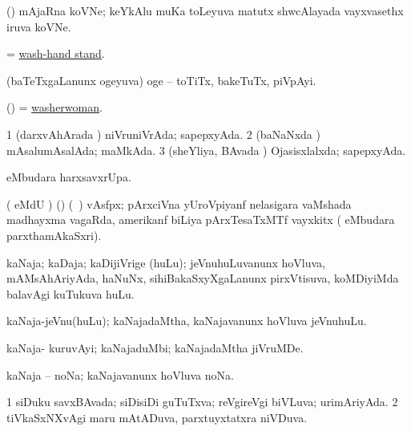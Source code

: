 \bentry
{} 
\gl{\nA}
\expl{}
\bmng
(\ame) mAjaRna koVNe; keYkAlu muKa toLeyuva matutx shwcAlayada vayxvasethx iruva koVNe. 
\emng
\eentry

\bentry
{} 
\gl{\nA}
\expl{}
\bmng
= \hyperlink{wash-hand stand}{wash-hand stand}. 
\emng
\eentry

\bentry
{} 
\gl{\nA}
\expl{}
\bmng
(baTeTxgaLanunx ogeyuva) oge -- toTiTx, bakeTuTx, piVpAyi. 
\emng
\eentry

\bentry
{} 
\gl{\nA}
\expl{}
\bmng
(\ame) = \hyperlink{washerwoman}{washerwoman}. 
\emng
\eentry

\bentry
{} 
\gl{\gu}
\expl{}
\bmng
\bnum
\num{1} (darxvAhArada \vi) niVruniVrAda; sapepxyAda. 
\num{2} (baNaNxda \vi) mAsalumAsalAda; maMkAda. 
\num{3} (sheYliya, BAvada \vi) Ojasisxlalxda; sapepxyAda. 
\enum
\emng
\eentry

\bentry
{} 
\bmng
{} eMbudara harxsavxrUpa. 
\emng
\eentry

\bentry
{} 
\gl{\nA}
\expl{}
\bmng
( eMdU \parx) (\ame) (\sA\ \hiV) vAsfpx; pArxciVna yUroVpiyanf nelasigara vaMshada madhayxma vagaRda, amerikanf biLiya pArxTesaTxMTf vayxkitx ( eMbudara parxthamAkaSxri). 
\emng
\eentry

{} 
\gl{\nA}
\expl{}
\bmng
kaNaja; kaDaja; kaDijiVrige (huLu); jeVnuhuLuvanunx hoVluva, mAMsAhAriyAda, haNuNx, sihiBakaSxyXgaLanunx pirxVtisuva, koMDiyiMda balavAgi kuTukuva huLu.  
\emng
\eentry

\bentry
{} 
\gl{\nA}
\expl{}
\bmng
kaNaja-jeVnu(huLu); kaNajadaMtha, kaNajavanunx hoVluva jeVnuhuLu. 
\emng
\eentry

\bentry
{} 
\gl{\nA}
\expl{}
\bmng
kaNaja- kuruvAyi; kaNajaduMbi; kaNajadaMtha jiVruMDe. 
\emng
\eentry

\bentry
{} 
\gl{\nA}
\expl{}
\bmng
kaNaja -- noNa; kaNajavanunx hoVluva noNa. 
\emng
\eentry

\bentry
{} 
\gl{\gu}
\expl{}
\bmng
\bnum
\num{1} siDuku savxBAvada; siDisiDi guTuTxva; reVgireVgi biVLuva; urimAriyAda. 
\num{2} tiVkaSxNXvAgi maru mAtADuva, parxtuyxtatxra niVDuva. 
\enum
\emng
\eentry


